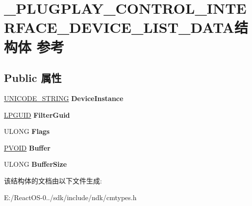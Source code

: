 \hypertarget{struct___p_l_u_g_p_l_a_y___c_o_n_t_r_o_l___i_n_t_e_r_f_a_c_e___d_e_v_i_c_e___l_i_s_t___d_a_t_a}{}\section{\+\_\+\+P\+L\+U\+G\+P\+L\+A\+Y\+\_\+\+C\+O\+N\+T\+R\+O\+L\+\_\+\+I\+N\+T\+E\+R\+F\+A\+C\+E\+\_\+\+D\+E\+V\+I\+C\+E\+\_\+\+L\+I\+S\+T\+\_\+\+D\+A\+T\+A结构体 参考}
\label{struct___p_l_u_g_p_l_a_y___c_o_n_t_r_o_l___i_n_t_e_r_f_a_c_e___d_e_v_i_c_e___l_i_s_t___d_a_t_a}
\subsection*{Public 属性}
\begin{DoxyCompactItemize}
\item 
\mbox{\label{struct___p_l_u_g_p_l_a_y___c_o_n_t_r_o_l___i_n_t_e_r_f_a_c_e___d_e_v_i_c_e___l_i_s_t___d_a_t_a_ab7c6473050ad918841396f2a9ed80c1e}} 
\hyperlink{struct___u_n_i_c_o_d_e___s_t_r_i_n_g}{U\+N\+I\+C\+O\+D\+E\+\_\+\+S\+T\+R\+I\+NG} {\bfseries Device\+Instance}
\item 
\mbox{\label{struct___p_l_u_g_p_l_a_y___c_o_n_t_r_o_l___i_n_t_e_r_f_a_c_e___d_e_v_i_c_e___l_i_s_t___d_a_t_a_afe355a42412b0e3df18f52c8e9371d7a}} 
\hyperlink{interface_g_u_i_d}{L\+P\+G\+U\+ID} {\bfseries Filter\+Guid}
\item 
\mbox{\label{struct___p_l_u_g_p_l_a_y___c_o_n_t_r_o_l___i_n_t_e_r_f_a_c_e___d_e_v_i_c_e___l_i_s_t___d_a_t_a_aee242d916487b18d342d211ddb26d1f3}} 
U\+L\+O\+NG {\bfseries Flags}
\item 
\mbox{\label{struct___p_l_u_g_p_l_a_y___c_o_n_t_r_o_l___i_n_t_e_r_f_a_c_e___d_e_v_i_c_e___l_i_s_t___d_a_t_a_ad533b5713e68c6acd3ec6d1d08be02e2}} 
\hyperlink{interfacevoid}{P\+V\+O\+ID} {\bfseries Buffer}
\item 
\mbox{\label{struct___p_l_u_g_p_l_a_y___c_o_n_t_r_o_l___i_n_t_e_r_f_a_c_e___d_e_v_i_c_e___l_i_s_t___d_a_t_a_aa1493c32957d2a1ab24824b481bf6974}} 
U\+L\+O\+NG {\bfseries Buffer\+Size}
\end{DoxyCompactItemize}


该结构体的文档由以下文件生成\+:\begin{DoxyCompactItemize}
\item 
E\+:/\+React\+O\+S-\/0../sdk/include/ndk/cmtypes.\+h\end{DoxyCompactItemize}
